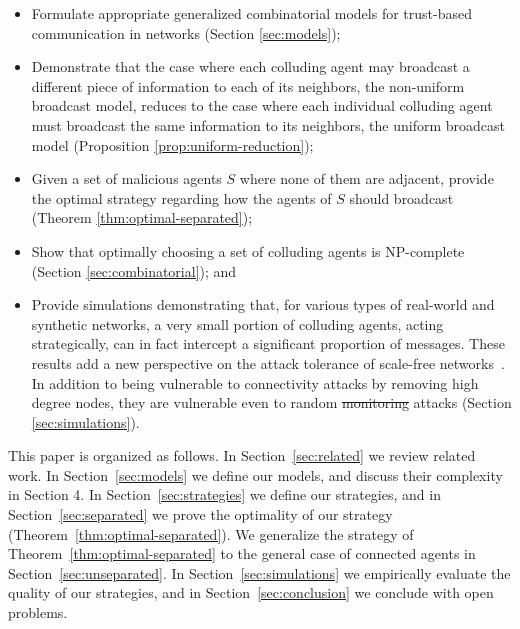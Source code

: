 \documentclass{comnet}
\providecommand{\DIFadd}[1]{{\protect\color{blue}\uwave{#1}}} %
\providecommand{\DIFdel}[1]{{\protect\color{red}\sout{#1}}}                      %
\providecommand{\DIFaddbegin}{} %
\providecommand{\DIFaddend}{} %
\providecommand{\DIFdelbegin}{} %
\providecommand{\DIFdelend}{} %
\begin{document}
\DIFaddend \begin{itemize}
\item Formulate appropriate generalized combinatorial models for trust-based
communication in networks (Section \ref{sec:models});
\DIFaddbegin 

\DIFaddend \item Demonstrate that the case where each colluding agent may broadcast a
different piece of information to each of its neighbors, the non-uniform
broadcast model, reduces to the case where each individual colluding agent must
broadcast the same information to its neighbors, the uniform broadcast model
(Proposition \ref{prop:uniform-reduction});
\DIFaddbegin 

\DIFaddend \item Given a set of malicious agents $S$ where none of them are adjacent,
provide the optimal strategy regarding how the agents of $S$ should broadcast
(Theorem \ref{thm:optimal-separated});
\DIFaddbegin 

\DIFaddend \item Show that optimally choosing a set of colluding agents is NP-complete
(Section \ref{sec:combinatorial}); and 
\DIFaddbegin 

\DIFaddend \item Provide simulations demonstrating that, for various types of real-world
and synthetic networks, a very small portion of colluding agents, acting
strategically,  can in fact intercept a significant proportion of messages.
These results add a new perspective on the attack tolerance of scale-free
networks~\cite{AlbertJB00}. In addition to being vulnerable to connectivity
attacks by removing high degree nodes, they are vulnerable even to random
\DIFdelbegin \DIFdel{monitoring }\DIFdelend \DIFaddbegin \DIFadd{interception }\DIFaddend attacks (Section \ref{sec:simulations}).
\DIFaddbegin 

\DIFaddend \end{itemize} 

This paper is organized as follows. In Section~\ref{sec:related} we review
related work. In Section~\ref{sec:models} we define our models, and discuss
their complexity in Section 4. In Section~\ref{sec:strategies} we define our
strategies, and in Section~\ref{sec:separated} we prove the optimality of our
strategy (Theorem~\ref{thm:optimal-separated}). We generalize the strategy of
Theorem~\ref{thm:optimal-separated} to the general case of connected agents in
Section~\ref{sec:unseparated}. In Section~\ref{sec:simulations} we empirically
evaluate the quality of our strategies, and in Section~\ref{sec:conclusion} we
conclude with open problems.
\end{document}
